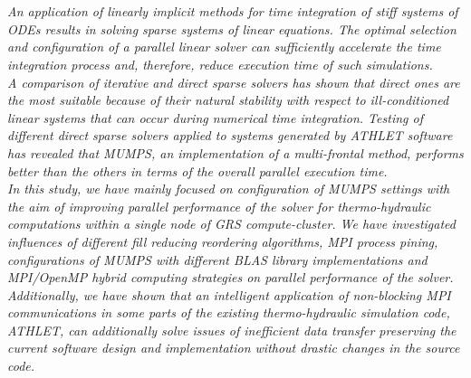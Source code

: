 \chapter{\abstractname}




\textit{An application of linearly implicit methods for time integration of stiff systems of ODEs  results in solving sparse systems of linear equations. The optimal selection and configuration of a parallel linear solver can sufficiently accelerate the time integration process and, therefore, reduce execution time of such simulations.}\\



\textit{A comparison of iterative and direct sparse solvers has shown that direct ones are the most suitable because of their natural stability with respect to ill-conditioned linear systems that can occur during numerical time integration. Testing of different direct sparse solvers applied to systems generated by ATHLET software has revealed that MUMPS, an implementation of a multi-frontal method, performs better than the others in terms of the overall parallel execution time.}\\


\textit{In this study, we have mainly focused on configuration of MUMPS settings with the aim of improving parallel performance of the solver for thermo-hydraulic computations within a single node of GRS compute-cluster. We have investigated influences of  different fill reducing reordering algorithms, MPI process pining, configurations of MUMPS with different BLAS library implementations and MPI/OpenMP hybrid computing strategies on parallel performance of the solver.}\\


\textit{Additionally, we have shown that an intelligent application of non-blocking MPI communications in some parts of the existing thermo-hydraulic simulation code, ATHLET, can additionally solve issues of inefficient data transfer preserving the current software design and implementation without drastic changes in the source code.}\\

